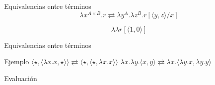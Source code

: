 \begin{frame}{Equivalencias entre términos}	
	\[ \lambda x^{A \times B}. r \rightleftarrows \lambda y^A. \lambda z^B. r[\langle y, z \rangle/x] \]

	\pause
	\[ \lambda \lambda r[\langle 1,0 \rangle] \]
	
	\pause
	
	\pause
	
\end{frame}

\begin{frame}{Equivalencias entre términos}	
\end{frame}

\begin{frame}{Ejemplo}
	$ \langle \star, \langle \lambda x.x, \star \rangle \rangle \rightleftarrows \langle \star, \langle \star, \lambda x.x \rangle \rangle $
	\pause
	$ \lambda x. \lambda y. \langle x, y \rangle \rightleftarrows \lambda x. \langle \lambda y.x, \lambda y.y \rangle $
\end{frame}

\begin{frame}{Evaluación}
\end{frame}

